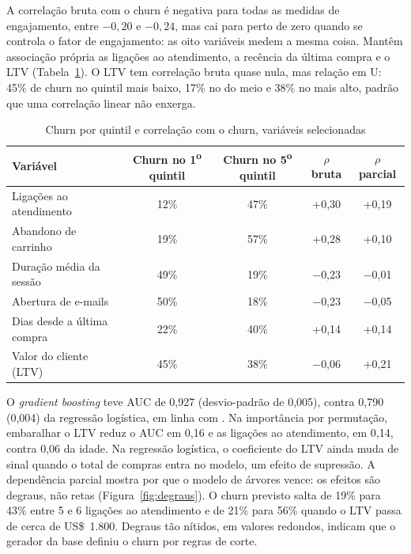 \documentclass[
  article,            %
  12pt,
  oneside,
  a4paper,
  section=TITLE,      %
  english,            %
  brazil              %
]{abntex2}
\newcommand{\tabelaabnt}{\footnotesize\SingleSpacing}
\begin{document}
A correlação bruta com o churn é negativa para todas as medidas de engajamento, entre $-0{,}20$ e $-0{,}24$, mas cai para perto de zero quando se controla o fator de engajamento: as oito variáveis medem a mesma coisa. Mantêm associação própria as ligações ao atendimento, a recência da última compra e o LTV (Tabela~\ref{tab:quintis}). O LTV tem correlação bruta quase nula, mas relação em U: 45\% de churn no quintil mais baixo, 17\% no do meio e 38\% no mais alto, padrão que uma correlação linear não enxerga.

\begin{table}[htbp]
  \centering
  \caption{Churn por quintil e correlação com o churn, variáveis selecionadas}
  \label{tab:quintis}
  \tabelaabnt
  \begin{tabular}{lcccc}
    \toprule
    \textbf{Variável} & \textbf{Churn no 1\textsuperscript{o} quintil} & \textbf{Churn no 5\textsuperscript{o} quintil} & \textbf{$\rho$ bruta} & \textbf{$\rho$ parcial} \\
    \midrule
    Ligações ao atendimento & 12\% & 47\% & +0,30 & +0,19 \\
    Abandono de carrinho & 19\% & 57\% & +0,28 & +0,10 \\
    Duração média da sessão & 49\% & 19\% & $-$0,23 & $-$0,01 \\
    Abertura de e-mails & 50\% & 18\% & $-$0,23 & $-$0,05 \\
    Dias desde a última compra & 22\% & 40\% & +0,14 & +0,14 \\
    Valor do cliente (LTV) & 45\% & 38\% & $-$0,06 & +0,21 \\
    \bottomrule
  \end{tabular}
\end{table}

O \textit{gradient boosting} teve AUC de 0,927 (desvio-padrão de 0,005), contra 0,790 (0,004) da regressão logística, em linha com . Na importância por permutação, embaralhar o LTV reduz o AUC em 0,16 e as ligações ao atendimento, em 0,14, contra 0,06 da idade. Na regressão logística, o coeficiente do LTV ainda muda de sinal quando o total de compras entra no modelo, um efeito de supressão. A dependência parcial mostra por que o modelo de árvores vence: os efeitos são degraus, não retas (Figura~\ref{fig:degraus}). O churn previsto salta de 19\% para 43\% entre 5 e 6 ligações ao atendimento e de 21\% para 56\% quando o LTV passa de cerca de US\$~1.800. Degraus tão nítidos, em valores redondos, indicam que o gerador da base definiu o churn por regras de corte.
\end{document}
